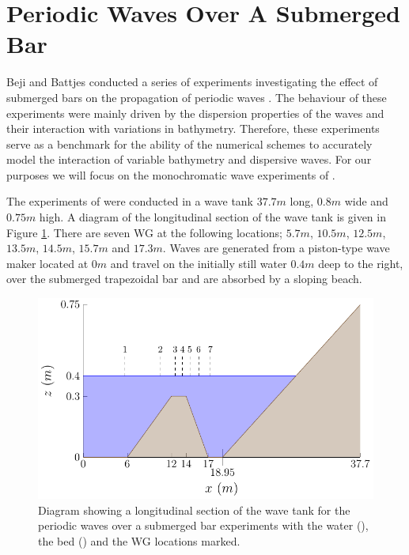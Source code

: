 \section{Periodic Waves Over A Submerged Bar}
\label{sec:PeriodicWavessubBar}
Beji and Battjes conducted a series of experiments investigating the effect of submerged bars on the propagation of periodic waves \cite{Beji-Battjes-1993-151,Beji-Battjes-1994-1}. The behaviour of these experiments were mainly driven by the dispersion properties of the waves and their interaction with variations in bathymetry. Therefore, these experiments serve as a benchmark for the ability of the numerical schemes to accurately model the interaction of variable bathymetry and dispersive waves. For our purposes we will focus on the monochromatic wave experiments of \citet{Beji-Battjes-1994-1}.

The experiments of \citet{Beji-Battjes-1994-1} were conducted in a wave tank $37.7m$ long, $0.8m$ wide and $0.75m$ high. A diagram of the longitudinal section of the wave tank is given in Figure \ref{fig:BejiWT}. There are seven WG at the following locations; $5.7m$, $10.5m$, $12.5m$, $13.5m$, $14.5m$, $15.7m$ and $17.3m$. Waves are generated from a piston-type wave maker located at $0m$ and travel on the initially still water $0.4m$ deep to the right, over the submerged trapezoidal bar and are absorbed by a sloping beach.
\begin{figure}
	\centering
	\includegraphics[width=\textwidth]{./chp6/figures/Experiment/Beji/BejiTank.pdf}
	\caption{Diagram showing a longitudinal section of the wave tank for the periodic waves over a submerged bar experiments with the water (), the bed () and the WG locations marked.}
	\label{fig:BejiWT}
\end{figure}


